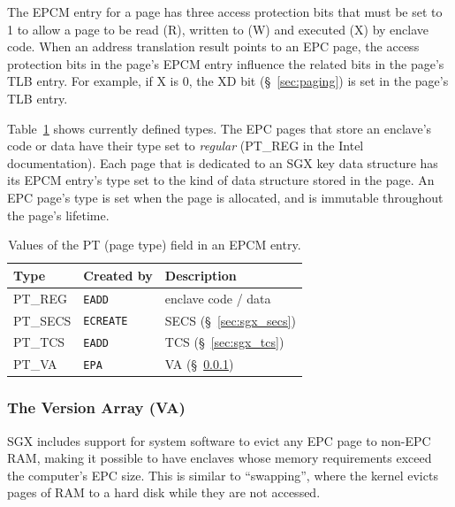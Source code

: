 
The EPCM entry for a page has three access protection bits that must be set to
1 to allow a page to be read (R), written to (W) and executed (X) by enclave
code. When an address translation result points to an EPC page, the access
protection bits in the page's EPCM entry influence the related bits in the
page's TLB entry. For example, if X is 0, the XD bit (\S~\ref{sec:paging}) is
set in the page's TLB entry.

Table~\ref{fig:sgx_pt_values} shows currently defined types. The EPC pages that
store an enclave's code or data have their type set to \textit{regular}
(PT\_REG in the Intel documentation). Each page that is dedicated to an SGX key
data structure has its EPCM entry's type set to the kind of data structure
stored in the page. An EPC page's type is set when the page is allocated, and
is immutable throughout the page's lifetime.

\begin{table}[hbt]
  \centering
  \begin{tabularx}{\columnwidth}{| l | l | X |}
  \hline
  \textbf{Type} & \textbf{Created by} & \textbf{Description}\\
  \hline
  PT\_REG & \texttt{EADD} & enclave code / data \\
  \hline
  PT\_SECS & \texttt{ECREATE} & SECS (\S~\ref{sec:sgx_secs}) \\
  \hline
  PT\_TCS & \texttt{EADD} & TCS (\S~\ref{sec:sgx_tcs}) \\
  \hline
  PT\_VA & \texttt{EPA} & VA (\S~\ref{sec:va}) \\
  \hline
  \end{tabularx}
  \caption{Values of the PT (page type) field in an EPCM entry.}
  \label{fig:sgx_pt_values}
\end{table}


\subsubsection{The Version Array (VA)}
\label{sec:va}

SGX includes support for system software to evict any EPC page to non-EPC RAM,
making it possible to have enclaves whose memory requirements exceed the
computer's EPC size. This is similar to ``swapping'', where the kernel evicts
pages of RAM to a hard disk while they are not accessed.


